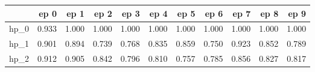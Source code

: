 \begin{tabular}{lrrrrrrrrrr}
\toprule
{} &   ep 0 &   ep 1 &   ep 2 &   ep 3 &   ep 4 &   ep 5 &   ep 6 &   ep 7 &   ep 8 &   ep 9 \\
\midrule
hp\_0 &  0.933 &  1.000 &  1.000 &  1.000 &  1.000 &  1.000 &  1.000 &  1.000 &  1.000 &  1.000 \\
hp\_1 &  0.901 &  0.894 &  0.739 &  0.768 &  0.835 &  0.859 &  0.750 &  0.923 &  0.852 &  0.789 \\
hp\_2 &  0.912 &  0.905 &  0.842 &  0.796 &  0.810 &  0.757 &  0.785 &  0.856 &  0.827 &  0.817 \\
\bottomrule
\end{tabular}
